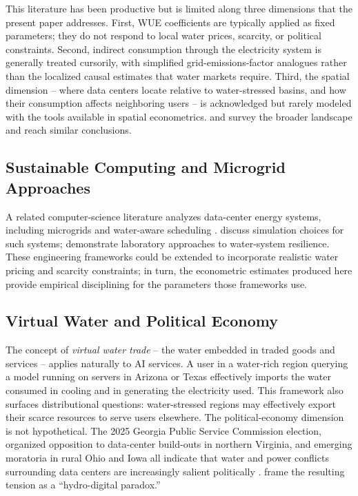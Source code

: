 \documentclass[11pt, letterpaper]{article}
\begin{document}
This literature has been productive but is limited along three dimensions that the present paper addresses. First, WUE coefficients are typically applied as fixed parameters; they do not respond to local water prices, scarcity, or political constraints. Second, indirect consumption through the electricity system is generally treated cursorily, with simplified grid-emissions-factor analogues rather than the localized causal estimates that water markets require. Third, the spatial dimension -- where data centers locate relative to water-stressed basins, and how their consumption affects neighboring users -- is acknowledged but rarely modeled with the tools available in spatial econometrics. \citet{iman2025hidden} and \citet{friedmann2024data} survey the broader landscape and reach similar conclusions.

\subsection{Sustainable Computing and Microgrid Approaches}

A related computer-science literature analyzes data-center energy systems, including microgrids and water-aware scheduling \citep{brannvall2020edge,daw2018energy,zhu2022energy,cui2024stochastic,hao2024joint,karki2023techno}. \citet{kilian2025choosing} discuss simulation choices for such systems; \citet{ale2025laboratory} demonstrate laboratory approaches to water-system resilience. These engineering frameworks could be extended to incorporate realistic water pricing and scarcity constraints; in turn, the econometric estimates produced here provide empirical disciplining for the parameters those frameworks use.

\subsection{Virtual Water and Political Economy}

The concept of \emph{virtual water trade} -- the water embedded in traded goods and services \citep{aldaya2023towards,kshetry2017foodsheds} -- applies naturally to AI services. A user in a water-rich region querying a model running on servers in Arizona or Texas effectively imports the water consumed in cooling and in generating the electricity used. This framework also surfaces distributional questions: water-stressed regions may effectively export their scarce resources to serve users elsewhere. The political-economy dimension is not hypothetical. The 2025 Georgia Public Service Commission election, organized opposition to data-center build-outs in northern Virginia, and emerging moratoria in rural Ohio and Iowa all indicate that water and power conflicts surrounding data centers are increasingly salient politically \citep{OhioSignal2025,WFMJ2025,LandHand2025}. \citet{natarajan2025hydro} frame the resulting tension as a ``hydro-digital paradox.''
\end{document}
